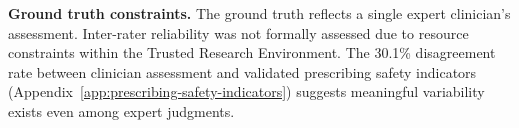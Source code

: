 \textbf{Ground truth constraints.} The ground truth reflects a single expert clinician's assessment. Inter-rater reliability was not formally assessed  due to resource constraints within the Trusted Research Environment. The 30.1\% disagreement rate between clinician assessment and validated prescribing safety indicators (Appendix~\ref{app:prescribing-safety-indicators}) suggests meaningful variability exists even among expert judgments.